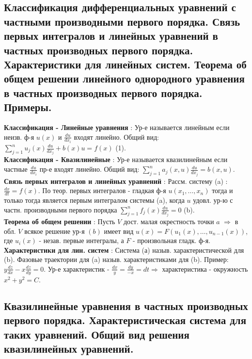 \documentclass[unicode, 8pt, a4paper,oneside, landscape]{article}
\begin{document}
\begin{multicols}{4}
\subsection{Классификация дифференциальных уравнений с частными производными первого порядка. Связь первых интегралов и линейных уравнений в частных производных первого порядка. Характеристики для линейных систем. Теорема об общем решении  линейного однородного уравнения в частных производных первого порядка. Примеры.}
{\bf Классификация - Линейные уравнения} : Ур-е называется линейным если неизв. ф-я $u(x)$ и $\frac{du}{dx_i}$ входят линейно. Общий вид: $\sum_{j=1}^n u_j(x) \frac{du}{dx_j} + b(x)u = f(x)$ (1).\\
{\bf Классификация - Квазилинейные} : Ур-е называется квазилинейным если частные $\frac{du}{dx_i}$ пр-е входят линейно. Общий вид: $\sum_{j=1}^n a_j(x, u)\frac{du}{dx_j} = b(x, u)$.\\
{\bf Связь первых интегралов и линейных уравнений} : Рассм. систему (a) : $\frac{dx}{dt} = f(x)$. По теор. первых интегралов - гладкая ф-я $u(x_1, \ldots, x_n)$ тогда и только тогда является первым интегралом системы (a), когда $u$ удовл. ур-ю с частн. производными первого порядка $\sum_{j=1}^n f_j(x)\frac{du}{dx_j} = 0$ (b).\\
{\bf Теорема об общем решении} : Пусть $V$ дост. малая окрестность точки $a$ $\Rightarrow$ в обл. $V$ всякое решение ур-я $(b)$ имеет вид $u(x) = F(u_1(x), \ldots, u_{n-1}(x))$, где $u_i(x)$ - незав. первые интегралы, а $F$ - произвольная гладк. ф-я.\\
{\bf Характеристики для лин. систем} : Система (а) назыв. характеристической для (b). Фазовые траектории для (a) назыв. характеристиками для (b). Пример: $y\frac{dz}{dx} - x\frac{dz}{dy} = 0$. Ур-е характеристик - $\frac{dx}{y} = \frac{dy}{-x} = dt \Rightarrow$ характеристика - окружность $x^2 + y^2 = C$.


\subsection{Квазилинейные уравнения в частных производных первого порядка. Характеристическая система для таких уравнений. Общий вид решения квазилинейных уравнений.}


\end{multicols}
\end{document}

